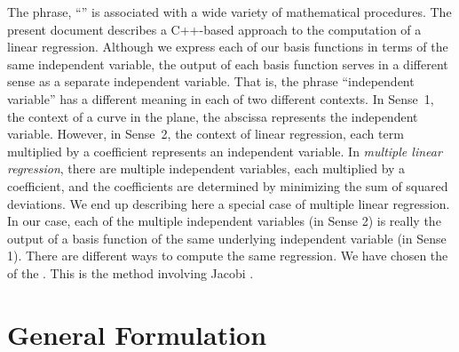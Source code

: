 \documentclass[twocolumn]{article}
\begin{document}
The phrase, ``'' is associated
with a wide variety of mathematical procedures. The present document describes
a C++-based approach to the computation of a linear regression.  Although we
express each of our basis functions in terms of the same independent variable,
the output of each basis function serves in a different sense as a separate
independent variable. That is, the phrase ``independent variable'' has a
different meaning in each of two different contexts. In Sense~1, the context of
a curve in the plane, the abscissa represents the independent variable.
However, in Sense~2, the context of linear regression, each term multiplied by
a coefficient represents an independent variable. In \emph{multiple linear
regression}, there are multiple independent variables, each multiplied by a
coefficient, and the coefficients are determined by minimizing the sum of
squared deviations.  We end up describing here a special case of multiple
linear regression. In our case, each of the multiple independent variables (in
Sense 2) is really the output of a basis function of the same underlying
independent variable (in Sense 1).  There are different ways to compute the
same regression. We have chosen the 
of the .  This is the
method involving Jacobi .

\section{General Formulation}
\end{document}
